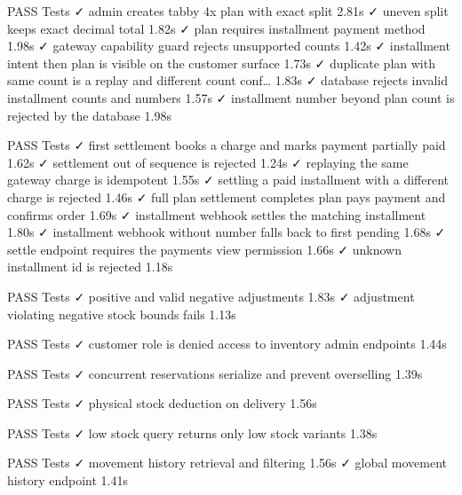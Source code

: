    PASS  Tests\Feature\InstallmentPlanTest
  ✓ admin creates tabby 4x plan with exact split                         2.81s  
  ✓ uneven split keeps exact decimal total                               1.82s  
  ✓ plan requires installment payment method                             1.98s  
  ✓ gateway capability guard rejects unsupported counts                  1.42s  
  ✓ installment intent then plan is visible on the customer surface      1.73s  
  ✓ duplicate plan with same count is a replay and different count conf… 1.83s  
  ✓ database rejects invalid installment counts and numbers              1.57s  
  ✓ installment number beyond plan count is rejected by the database     1.98s  

   PASS  Tests\Feature\InstallmentSettlementTest
  ✓ first settlement books a charge and marks payment partially paid     1.62s  
  ✓ settlement out of sequence is rejected                               1.24s  
  ✓ replaying the same gateway charge is idempotent                      1.55s  
  ✓ settling a paid installment with a different charge is rejected      1.46s  
  ✓ full plan settlement completes plan pays payment and confirms order  1.69s  
  ✓ installment webhook settles the matching installment                 1.80s  
  ✓ installment webhook without number falls back to first pending       1.68s  
  ✓ settle endpoint requires the payments view permission                1.66s  
  ✓ unknown installment id is rejected                                   1.18s  

   PASS  Tests\Feature\InventoryAdjustmentTest
  ✓ positive and valid negative adjustments                              1.83s  
  ✓ adjustment violating negative stock bounds fails                     1.13s  

   PASS  Tests\Feature\InventoryAuthorizationTest
  ✓ customer role is denied access to inventory admin endpoints          1.44s  

   PASS  Tests\Feature\InventoryConcurrencyTest
  ✓ concurrent reservations serialize and prevent overselling            1.39s  

   PASS  Tests\Feature\InventoryDeductionTest
  ✓ physical stock deduction on delivery                                 1.56s  

   PASS  Tests\Feature\InventoryLowStockTest
  ✓ low stock query returns only low stock variants                      1.38s  

   PASS  Tests\Feature\InventoryMovementHistoryTest
  ✓ movement history retrieval and filtering                             1.56s  
  ✓ global movement history endpoint                                     1.41s  

